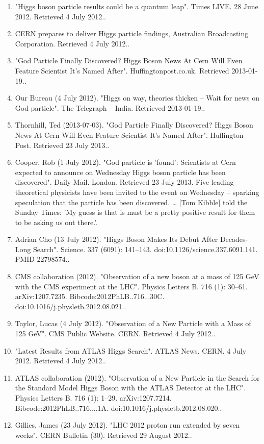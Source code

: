 \begin{enumerate}
    \item "Higgs boson particle results could be a quantum leap". Times LIVE. 28 June 2012. Retrieved 4 July 2012..
    \item CERN prepares to deliver Higgs particle findings, Australian Broadcasting Corporation. Retrieved 4 July 2012..
    \item "God Particle Finally Discovered? Higgs Boson News At Cern Will Even Feature Scientist It's Named After". Huffingtonpost.co.uk. Retrieved 2013-01-19..
    \item Our Bureau (4 July 2012). "Higgs on way, theories thicken – Wait for news on God particle". The Telegraph – India. Retrieved 2013-01-19..
    \item Thornhill, Ted (2013-07-03). "God Particle Finally Discovered? Higgs Boson News At Cern Will Even Feature Scientist It's Named After". Huffington Post. Retrieved 23 July 2013..
    \item Cooper, Rob (1 July 2012). "God particle is 'found': Scientists at Cern expected to announce on Wednesday Higgs boson particle has been discovered". Daily Mail. London. Retrieved 23 July 2013. Five leading theoretical physicists have been invited to the event on Wednesday – sparking speculation that the particle has been discovered. … [Tom Kibble] told the Sunday Times: 'My guess is that is must be a pretty positive result for them to be asking us out there.'.
    \item Adrian Cho (13 July 2012). "Higgs Boson Makes Its Debut After Decades-Long Search". Science. 337 (6091): 141–143. doi:10.1126/science.337.6091.141. PMID 22798574..
    \item CMS collaboration (2012). "Observation of a new boson at a mass of 125 GeV with the CMS experiment at the LHC". Physics Letters B. 716 (1): 30–61. arXiv:1207.7235. Bibcode:2012PhLB..716...30C. doi:10.1016/j.physletb.2012.08.021..
    \item Taylor, Lucas (4 July 2012). "Observation of a New Particle with a Mass of 125 GeV". CMS Public Website. CERN. Retrieved 4 July 2012..
    \item "Latest Results from ATLAS Higgs Search". ATLAS News. CERN. 4 July 2012. Retrieved 4 July 2012..
    \item ATLAS collaboration (2012). "Observation of a New Particle in the Search for the Standard Model Higgs Boson with the ATLAS Detector at the LHC". Physics Letters B. 716 (1): 1–29. arXiv:1207.7214. Bibcode:2012PhLB..716....1A. doi:10.1016/j.physletb.2012.08.020..
    \item Gillies, James (23 July 2012). "LHC 2012 proton run extended by seven weeks". CERN Bulletin (30). Retrieved 29 August 2012..

\end{enumerate}
